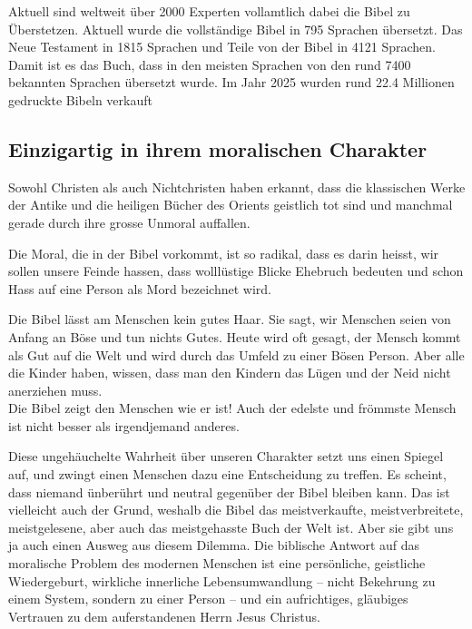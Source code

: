 Aktuell sind weltweit über 2000 Experten vollamtlich dabei die Bibel zu Überstetzen. Aktuell wurde die vollständige Bibel in 795 Sprachen übersetzt. Das Neue Testament in 1815 Sprachen und Teile von der Bibel in 4121 Sprachen. Damit ist es das Buch, dass in den meisten Sprachen von den rund 7400 bekannten Sprachen übersetzt wurde. Im Jahr 2025 wurden rund 22.4 Millionen gedruckte Bibeln verkauft

\subsection{Einzigartig in ihrem moralischen Charakter}

Sowohl Christen als auch Nichtchristen haben erkannt, dass die klassischen Werke der Antike und die heiligen Bücher des Orients geistlich tot sind und manchmal gerade durch ihre grosse Unmoral auffallen.

Die Moral, die in der Bibel vorkommt, ist so radikal, dass es darin heisst, wir sollen unsere Feinde hassen, dass wolllüstige Blicke Ehebruch bedeuten und schon Hass auf eine Person als Mord bezeichnet wird.

Die Bibel lässt am Menschen kein gutes Haar. Sie sagt, wir Menschen seien von Anfang an Böse und tun nichts Gutes. Heute wird oft gesagt, der Mensch kommt als Gut auf die Welt und wird durch das Umfeld zu einer Bösen Person. Aber alle die Kinder haben, wissen, dass man den Kindern das Lügen und der Neid nicht anerziehen muss.\\
Die Bibel zeigt den Menschen wie er ist! Auch der edelste und frömmste Mensch ist nicht besser als irgendjemand anderes.

Diese ungehäuchelte Wahrheit über unseren Charakter setzt uns einen Spiegel auf, und zwingt einen Menschen dazu eine Entscheidung zu treffen. Es scheint, dass niemand ünberührt und neutral gegenüber der Bibel bleiben kann. Das ist vielleicht auch der Grund, weshalb die Bibel das meistverkaufte, meistverbreitete, meistgelesene, aber auch das meistgehasste Buch der Welt ist. Aber sie gibt uns ja auch einen Ausweg aus diesem Dilemma. Die biblische Antwort auf das moralische Problem des modernen Menschen ist eine persönliche, geistliche Wiedergeburt, wirkliche innerliche Lebensumwandlung -- nicht Bekehrung zu einem System, sondern zu einer Person -- und ein aufrichtiges, gläubiges Vertrauen zu dem auferstandenen Herrn Jesus Christus.